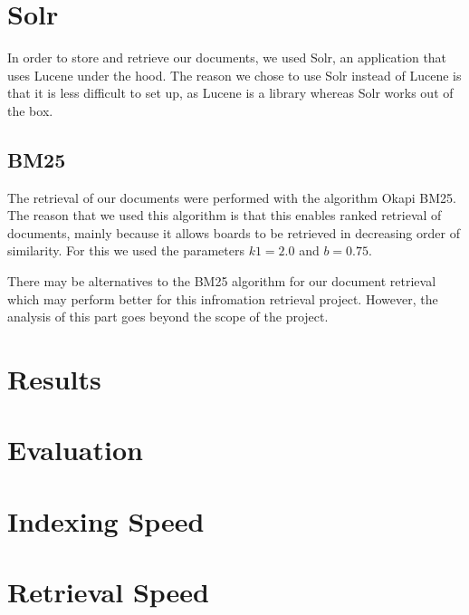 \documentclass[11pt]{article}
\begin{document}
    \section{Solr}

    In order to store and retrieve our documents, we used Solr, an application that uses Lucene under the hood. The reason we chose to use Solr instead of Lucene is that it is less difficult to set up, as Lucene is a library whereas Solr works out of the box.

    \subsection{BM25}

    The retrieval of our documents were performed with the algorithm Okapi BM25. The reason that we used this algorithm is that this enables ranked retrieval of documents, mainly because it allows boards to be retrieved in decreasing order of similarity. For this we used the parameters $k1 = 2.0$ and $b = 0.75$.



    There may be alternatives to the BM25 algorithm for our document retrieval which may perform better for this infromation retrieval project. However, the analysis of this part goes beyond the scope of the project.




    \section{Results}


    \section{Evaluation}


    \section{Indexing Speed}


    \section{Retrieval Speed}
\end{document}
